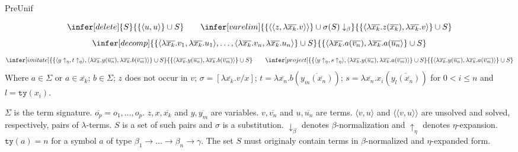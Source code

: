\begin{entry}{PreUnif}


\newcommand{\upair}[2]{\langle#1, #2\rangle}
\newcommand{\spair}[2]{\langle\langle#1, #2\rangle\rangle}
\newcommand{\vco}[2]{#1_1,\ldots,#1_{#2}}
\newcommand{\vc}[2]{\overline{#1_{#2}}}

\begin{calculus}


\[
\infer[delete] {S}
               {\{\upair u u\} \cup S}
\qquad
\infer[varelim]{\{\spair z {{\lambda \vc x k}.v}\} \cup \sigma(S)\downarrow_\beta}
               {\{\upair {{\lambda\vc x k.z(\vc x k)}} {\lambda\vc x k.v}\} \cup S}
\]
\[
\infer[decomp] {\{\upair {{\lambda\vc x k}.v_1} {{\lambda\vc x k}.u_1} ,\ldots,
                  \upair {{\lambda\vc x k}.v_n} {{\lambda\vc x k}.u_n}\}  \cup S}
               {\{\upair {{\lambda\vc x k}.a(\vc v n)}
                         {{\lambda\vc x k}.a(\vc u n}\} \cup S}
\]
\[
\infer[imitate]{\{\upair {y\uparrow_\eta} {t\uparrow_\eta}, \upair {\lambda\vc x k.y(\vc u n)}
                 {\lambda\vc x k.b(\vc v m)}\} \cup S}
               {\{\upair {\lambda\vc x k.y(\vc u n)}
               {\lambda\vc x k.b(\vc v m)}\} \cup S}
\qquad
\infer[project]{\{\upair {y\uparrow_\eta} {s\uparrow_\eta}, \upair {\lambda\vc x k.y(\vc u n)}
                 {\lambda\vc x k.a(\vc v m)}\} \cup S}
               {\{\upair {\lambda\vc x k.y(\vc u n)}
               {\lambda\vc x k.a(\vc v m)}\} \cup S}
\]
Where $a\in\Sigma$ or $a\in{\vc x k}$; $b\in\Sigma$; $z$ does not occur in $v$;
$\sigma = [\lambda\vc x k.v/x]$; $t = \lambda\vc x n.b(\overline{y_m(\vc x n)})$;
$s = \lambda\vc x n.x_i(\overline{y_l(\vc x n)})$ for $0<i\leq n$ and $l = \texttt{ty}(x_i)$.
\end{calculus}

 \begin{clarifications}
  $\Sigma$ is the term signature. $\vc o p = \vco o p$. $z,x,\vc x k$ and $y,\vc y m$ are variables.
  $v,\vc v n$ and $u,\vc u n$ are terms.
  $\upair v u$ and $\spair v u$ are unsolved and solved, respectively, pairs of $\lambda$-terms.
  $S$ is a set of such pairs and $\sigma$ is a substitution.
  $\downarrow_\beta$ denotes $\beta$-normalization and $\uparrow_\eta$ denotes $\eta$-expansion.
  $\texttt{ty}(a) = n$ for a symbol $a$ of type $\beta_1\rightarrow\ldots\rightarrow \beta_n\rightarrow \gamma$.
  The set $S$ must originaly contain terms in $\beta$-normalized and $\eta$-expanded form.
   \end{clarifications}



\end{entry}
